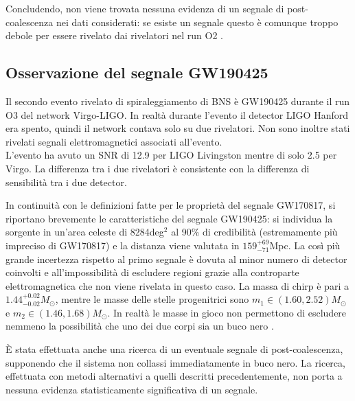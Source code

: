 Concludendo, non viene trovata nessuna evidenza di un segnale di post-coalescenza nei dati considerati: se esiste un segnale questo è comunque troppo debole per essere rivelato dai rivelatori nel run O2 \cite{Abbott_2017b}.

\subsection{Osservazione del segnale GW190425}
Il secondo evento rivelato di spiraleggiamento di BNS è GW190425 durante il run O3 del network Virgo-LIGO. In realtà durante l'evento il detector LIGO Hanford era spento, quindi il network contava solo su due rivelatori. Non sono inoltre stati rivelati segnali elettromagnetici associati all'evento.\\
L'evento ha avuto un SNR di 12.9 per LIGO Livingston mentre di solo 2.5 per Virgo. La differenza tra i due rivelatori è consistente con la differenza di sensibilità tra i due detector\cite{Abbott_2020b}.

In continuità con le definizioni fatte per le proprietà del segnale GW170817, si riportano brevemente le caratteristiche del segnale GW190425: si individua la sorgente in un'area celeste di 8284deg$^2$ al 90\% di credibilità (estremamente più impreciso di GW170817) e la distanza viene valutata in $159_{-71}^{+69}$Mpc. La così più grande incertezza rispetto al primo segnale è dovuta al minor numero di detector coinvolti e all'impossibilità di escludere regioni grazie alla controparte elettromagnetica che non viene rivelata in questo caso.
La massa di chirp è pari a $1.44^{+0.02}_{-0.02}M_\odot$, mentre le masse delle stelle progenitrici sono $m_1 \in (1.60, 2.52)M_\odot$ e $m_2 \in (1.46, 1.68)M_\odot$\cite{Abbott_2020b}. 
In realtà le masse in gioco non permettono di escludere nemmeno la possibilità che uno dei due corpi sia un buco nero \cite{Han_2020}.

È stata effettuata anche una ricerca di un eventuale segnale di post-coalescenza, supponendo che il sistema non collassi immediatamente in buco nero. La ricerca, effettuata con metodi alternativi a quelli descritti precedentemente, non porta a nessuna evidenza statisticamente significativa di un segnale\cite{Abbott_2020b}.

